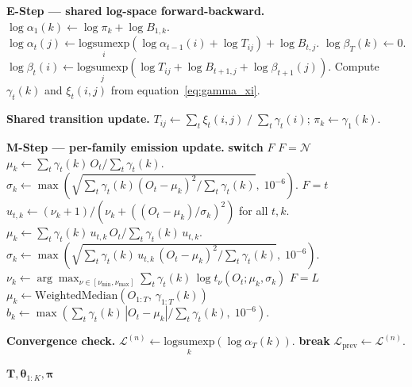 \begin{algorithm}[tp]
\begin{algorithmic}[1]
    \STATE \textbf{E-Step --- shared log-space forward-backward.}
    \STATE $\log \alpha_1(k) \leftarrow \log \pi_k + \log B_{1,k}$.
        \STATE $\log \alpha_t(j) \leftarrow \underset{i}{\text{logsumexp}}\!\left(\log \alpha_{t-1}(i) + \log T_{ij}\right) + \log B_{t,j}$.
    \ENDFOR
    \STATE $\log \beta_T(k) \leftarrow 0$.
        \STATE $\log \beta_t(i) \leftarrow \underset{j}{\text{logsumexp}}\!\left(\log T_{ij} + \log B_{t+1,j} + \log \beta_{t+1}(j)\right)$.
    \ENDFOR
    \STATE Compute $\gamma_t(k)$ and $\xi_t(i,j)$ from equation~\eqref{eq:gamma_xi}.

    \STATE \textbf{Shared transition update.} $T_{ij} \leftarrow \sum_t \xi_t(i,j) \;/\; \sum_t \gamma_t(i)$; $\pi_k \leftarrow \gamma_1(k)$.

    \STATE \textbf{M-Step --- per-family emission update.} \label{line:mstep}
    \STATE \textbf{switch} $F$
    \STATE \quad $F = \mathcal{N}$ 
    \STATE \qquad $\mu_k \leftarrow \sum_t \gamma_t(k)\, O_t / \sum_t \gamma_t(k)$.
    \STATE \qquad $\sigma_k \leftarrow \max\!\left(\sqrt{\sum_t \gamma_t(k) (O_t - \mu_k)^2 / \sum_t \gamma_t(k)},\; 10^{-6}\right)$.
    \STATE \quad $F = t$ 
    \STATE \qquad $u_{t,k} \leftarrow (\nu_k + 1) / (\nu_k + ((O_t - \mu_k)/\sigma_k)^2)$ for all $t, k$.
    \STATE \qquad $\mu_k \leftarrow \sum_t \gamma_t(k)\, u_{t,k}\, O_t / \sum_t \gamma_t(k)\, u_{t,k}$.
    \STATE \qquad $\sigma_k \leftarrow \max\!\left(\sqrt{\sum_t \gamma_t(k)\, u_{t,k}\,(O_t - \mu_k)^2 / \sum_t \gamma_t(k)},\; 10^{-6}\right)$.
    \STATE \qquad $\nu_k \leftarrow \arg\max_{\nu \in [\nu_{\min}, \nu_{\max}]} \sum_t \gamma_t(k)\, \log t_\nu(O_t; \mu_k, \sigma_k)$ 
    \STATE \quad $F = L$ 
    \STATE \qquad $\mu_k \leftarrow \text{WeightedMedian}(O_{1:T},\, \gamma_{1:T}(k))$ 
    \STATE \qquad $b_k \leftarrow \max\!\left(\sum_t \gamma_t(k)\, |O_t - \mu_k| / \sum_t \gamma_t(k),\; 10^{-6}\right)$.

    \STATE \textbf{Convergence check.} $\mathcal{L}^{(n)} \leftarrow \underset{k}{\text{logsumexp}}(\log \alpha_T(k))$.
     \STATE \textbf{break} \ENDIF
    \STATE $\mathcal{L}_{\text{prev}} \leftarrow \mathcal{L}^{(n)}$.
\ENDFOR

\RETURN $\mathbf{T}, \boldsymbol\theta_{1:K}, \boldsymbol{\pi}$ 
\end{algorithmic}
\end{algorithm}

